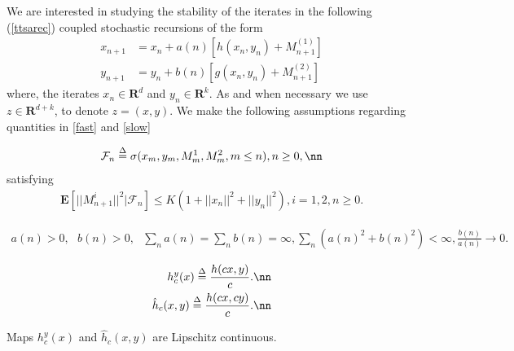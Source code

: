 We are interested in studying the stability of the iterates in the following (\eqref{ttsarec}) coupled stochastic recursions of the form
\begin{subequations}\label{ttsarec}
\begin{align}
\label{fast}x_{n+1}&=x_n+a(n)[h(x_n,y_n)+M^{(1)}_{n+1}]\\
\label{slow}y_{n+1}&=y_n+b(n)[g(x_n,y_n)+M^{(2)}_{n+1}]
\end{align}
\end{subequations}
where, the iterates $x_n \in \mathbf{R}^d$ and $y_n \in \mathbf{R}^k$. As and when necessary we use $z \in \mathbf{R}^{d+k}$, to denote $z=(x,y)$. We make the following assumptions regarding quantities in \eqref{fast} and \eqref{slow}
\begin{assumption}\label{lip}
\end{assumption}
\begin{assumption}\label{martbdd}
\begin{align}
\mathcal{F}_n\stackrel{\Delta}{=} \sigma(x_m,y_m,M^1_m,M^2_m,m\leq n), n \geq 0,\nn
\end{align}
satisfying
\begin{align}
\mathbf{E}[||M^{i}_{n+1}||^2|\mathcal{F}_n]\leq K(1+||x_n||^2+||y_n||^2), i=1, 2, n\geq 0.
\end{align}
\end{assumption}
\begin{assumption}
\begin{align}
a(n) > 0,\mbox{ } b(n) >0,\mbox{ } \underset{n}{\sum} a(n) = \underset{n}{\sum} b(n) =\infty, \underset{n}{\sum}(a(n)^2+b(n)^2) < \infty, \frac{b(n)}{a(n)} \rightarrow 0.
\end{align}
\end{assumption}
\begin{definition}
\begin{align}
h^y_c(x)\stackrel{\Delta}{=}\frac{h(cx,y)}{c}.\nn\\
\hat{h}_c(x,y)\stackrel{\Delta}{=}\frac{h(cx,cy)}{c}.\nn
\end{align}
\end{definition}
\begin{lemma}
Maps $h^y_c(x)$ and $\hat{h}_c(x,y)$ are Lipschitz continuous.
\end{lemma}
